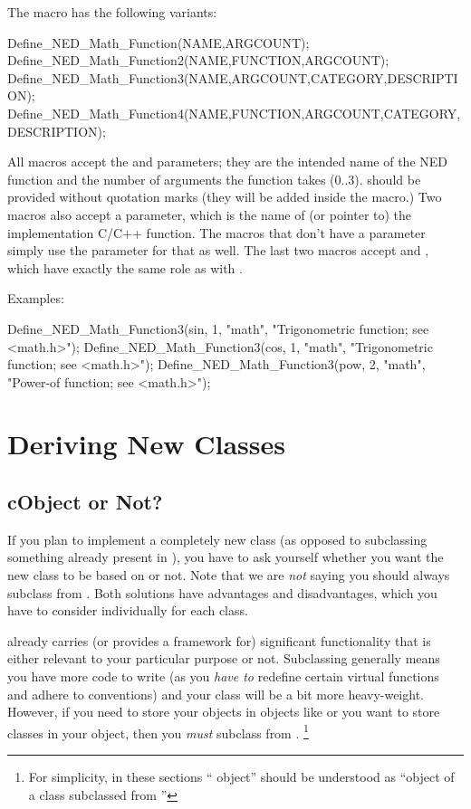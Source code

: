 The macro has the following variants:

\begin{cpp}
Define_NED_Math_Function(NAME,ARGCOUNT);
Define_NED_Math_Function2(NAME,FUNCTION,ARGCOUNT);
Define_NED_Math_Function3(NAME,ARGCOUNT,CATEGORY,DESCRIPTION);
Define_NED_Math_Function4(NAME,FUNCTION,ARGCOUNT,CATEGORY,DESCRIPTION);
\end{cpp}

All macros accept the  and  parameters; they are
the intended name of the NED function and the number of 
arguments the function takes (0..3).  should be provided without
quotation marks (they will be added inside the macro.) Two macros also
accept a  parameter, which is the name of (or pointer to) the
implementation C/C++ function. The macros that don't have a 
parameter simply use the  parameter for that as well. The last
two macros accept  and , which have exactly
the same role as with .

Examples:

\begin{cpp}
Define_NED_Math_Function3(sin, 1, "math", "Trigonometric function; see <math.h>");
Define_NED_Math_Function3(cos, 1, "math", "Trigonometric function; see <math.h>");
Define_NED_Math_Function3(pow, 2, "math", "Power-of function; see <math.h>");
\end{cpp}



\section{Deriving New Classes}
\label{sec:sim-lib:deriving-new-classes}

\subsection{cObject or Not?}
\label{sec:sim-lib:cobject-or-not}

If you plan to implement a completely new class (as opposed to
subclassing something already present in {\opp}), you have
to ask yourself whether you want the new class to be based
on  or not.
Note that we are \textit{not} saying you should always
subclass from .
Both solutions have advantages and disadvantages, which you
have to consider individually for each class.

 already carries (or provides a framework for)
significant functionality that is either relevant to
your particular purpose or not. Subclassing 
generally means you have more code to write (as you \textit{have to}
redefine certain virtual functions and adhere to conventions)
and your class will be a bit more heavy-weight.
However, if you need to store your objects in {\opp} objects like 
or you want to store {\opp} classes in your object,
then you \textit{must} subclass from .
  \footnote{For simplicity, in these sections ``{\opp} object''
  should be understood as ``object of a class subclassed from
  ''}

